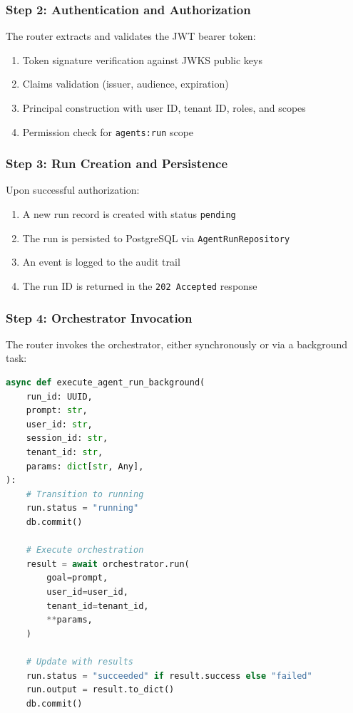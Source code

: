 \documentclass[a4paper,twoside]{sapthesis}
\begin{document}
\subsubsection{Step 2: Authentication and Authorization}

The router extracts and validates the JWT bearer token:

\begin{enumerate}
    \item Token signature verification against JWKS public keys
    \item Claims validation (issuer, audience, expiration)
    \item Principal construction with user ID, tenant ID, roles, and scopes
    \item Permission check for \texttt{agents:run} scope
\end{enumerate}

\subsubsection{Step 3: Run Creation and Persistence}

Upon successful authorization:

\begin{enumerate}
    \item A new run record is created with status \texttt{pending}
    \item The run is persisted to PostgreSQL via \texttt{AgentRunRepository}
    \item An event is logged to the audit trail
    \item The run ID is returned in the \texttt{202 Accepted} response
\end{enumerate}

\subsubsection{Step 4: Orchestrator Invocation}

The router invokes the orchestrator, either synchronously or via a background task:

\begin{lstlisting}[language=Python, caption={Orchestrator invocation}, label=lst:orch-invoke]
async def execute_agent_run_background(
    run_id: UUID,
    prompt: str,
    user_id: str,
    session_id: str,
    tenant_id: str,
    params: dict[str, Any],
):
    # Transition to running
    run.status = "running"
    db.commit()
    
    # Execute orchestration
    result = await orchestrator.run(
        goal=prompt,
        user_id=user_id,
        tenant_id=tenant_id,
        **params,
    )
    
    # Update with results
    run.status = "succeeded" if result.success else "failed"
    run.output = result.to_dict()
    db.commit()
\end{lstlisting}
\end{document}
